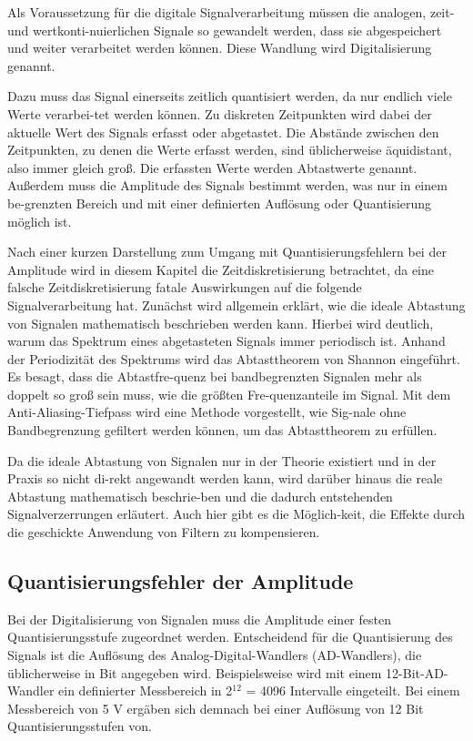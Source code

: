 \noindent Als Voraussetzung für die digitale Signalverarbeitung müssen die analogen, zeit- und wertkonti-nuierlichen Signale so gewandelt werden, dass sie abgespeichert und weiter verarbeitet werden können. Diese Wandlung wird Digitalisierung genannt.\medskip

\noindent Dazu muss das Signal einerseits zeitlich quantisiert werden, da nur endlich viele Werte verarbei-tet werden können. Zu diskreten Zeitpunkten wird dabei der aktuelle Wert des Signals erfasst oder abgetastet. Die Abstände zwischen den Zeitpunkten, zu denen die Werte erfasst werden, sind üblicherweise äquidistant, also immer gleich groß. Die erfassten Werte werden Abtastwerte genannt. Außerdem muss die Amplitude des Signals bestimmt werden, was nur in einem be-grenzten Bereich und mit einer definierten Auflösung oder Quantisierung möglich ist. \medskip

\noindent Nach einer kurzen Darstellung zum Umgang mit Quantisierungsfehlern bei der Amplitude wird in diesem Kapitel die Zeitdiskretisierung betrachtet, da eine falsche Zeitdiskretisierung fatale Auswirkungen auf die folgende Signalverarbeitung hat. Zunächst wird allgemein erklärt, wie die ideale Abtastung von Signalen mathematisch beschrieben werden kann. Hierbei wird deutlich, warum das Spektrum eines abgetasteten Signals immer periodisch ist. Anhand der Periodizität des Spektrums wird das Abtasttheorem von Shannon eingeführt. Es besagt, dass die Abtastfre-quenz bei bandbegrenzten Signalen mehr als doppelt so groß sein muss, wie die größten Fre-quenzanteile im Signal. Mit dem Anti-Aliasing-Tiefpass wird eine Methode vorgestellt, wie Sig-nale ohne Bandbegrenzung gefiltert werden können, um das Abtasttheorem zu erfüllen. \medskip

\noindent Da die ideale Abtastung von Signalen nur in der Theorie existiert und in der Praxis so nicht di-rekt angewandt werden kann, wird darüber hinaus die reale Abtastung mathematisch beschrie-ben und die dadurch entstehenden Signalverzerrungen erläutert. Auch hier gibt es die Möglich-keit, die Effekte durch die geschickte Anwendung von Filtern zu kompensieren.


\subsection{Quantisierungsfehler der Amplitude}

\noindent Bei der Digitalisierung von Signalen muss die Amplitude einer festen Quantisierungsstufe zugeordnet werden. Entscheidend für die Quantisierung des Signals ist die Auflösung des Analog-Digital-Wandlers (AD-Wandlers), die üblicherweise in Bit angegeben wird. Beispielsweise wird mit einem 12-Bit-AD-Wandler ein definierter Messbereich in 2${}^{12}$ = 4096 Intervalle eingeteilt. Bei einem Messbereich von 5 V ergäben sich demnach bei einer Auflösung von 12 Bit Quantisierungsstufen von. 

